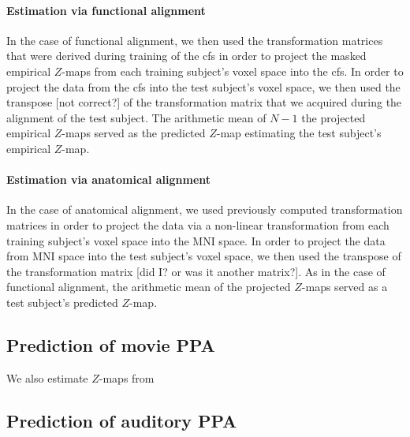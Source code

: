 \paragraph{Estimation via functional alignment}
In the case of functional alignment, we then used the transformation matrices
that were derived during training of the \ac{cfs} in order to project the masked
empirical $Z$-maps from each training subject's voxel space into the \ac{cfs}.
In order to project the data from the \ac{cfs} into the test subject's voxel
space, we then used the transpose [not correct?] of the transformation matrix that we acquired
during the alignment of the test subject.
The arithmetic mean of $N-1$ the projected empirical $Z$-maps served as the
predicted $Z$-map estimating the test subject's empirical $Z$-map.


\paragraph{Estimation via anatomical alignment}


In the case of anatomical alignment, we used previously computed transformation
matrices
\citep[][\href{https://github.com/psychoinformatics-de/studyforrest-data-templatetransforms}{\url{github.com/psychoinformatics-de/studyforrest-data-templatetransforms}}]{hanke2014audiomovie}
in order to project the data via a non-linear transformation from each training
subject's voxel space into the MNI space.
In order to project the data from MNI space into the test subject's voxel space,
we then used the transpose of the transformation matrix [did I? or was it
another matrix?].
As in the case of functional alignment, the arithmetic mean of the projected
$Z$-maps served as a test subject's predicted $Z$-map.

\subsection{Prediction of movie PPA}

We also estimate $Z$-maps from \citet{haeusler2022processing}

\subsection{Prediction of auditory PPA}

